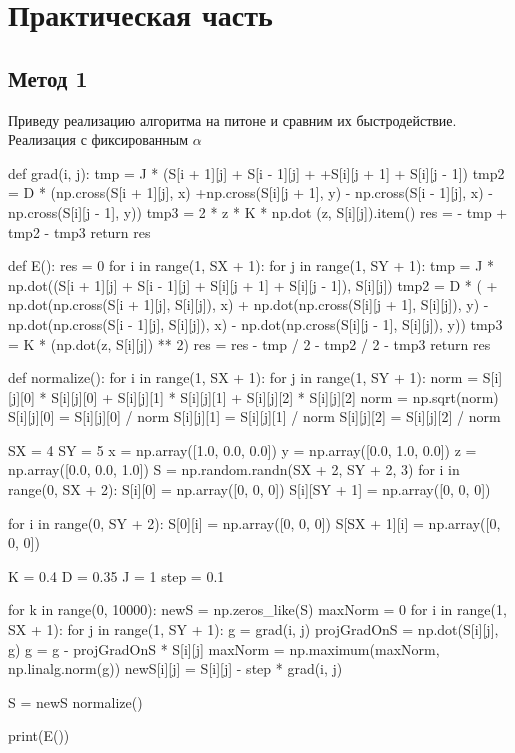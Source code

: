 \documentclass[ 12pt,x11names]{article}
\begin{document}
    \section{Практическая часть}
    \subsection{Метод 1}
    Приведу реализацию алгоритма на питоне и  сравним их быстродействие.
    Реализация с фиксированным $\alpha$\\
\begin{python}
    def grad(i, j):
        tmp = J * (S[i + 1][j] + S[i - 1][j] +
        +S[i][j + 1] + S[i][j - 1])
        tmp2 = D * (np.cross(S[i + 1][j], x)
        +np.cross(S[i][j + 1], y)
        - np.cross(S[i - 1][j], x)
        - np.cross(S[i][j - 1], y))
        tmp3 = 2 * z * K * np.dot  (z, S[i][j]).item()
        res = - tmp + tmp2 - tmp3
        return res

    def E():
        res = 0
        for i in range(1, SX + 1):
            for j in range(1, SY + 1):
                tmp = J * np.dot((S[i + 1][j] + S[i - 1][j] +
                S[i][j + 1] + S[i][j - 1]), S[i][j])
                tmp2 = D * (
                + np.dot(np.cross(S[i + 1][j], S[i][j]), x)
                + np.dot(np.cross(S[i][j + 1], S[i][j]), y)
                - np.dot(np.cross(S[i - 1][j], S[i][j]), x)
                - np.dot(np.cross(S[i][j - 1], S[i][j]), y))
                tmp3 = K * (np.dot(z, S[i][j]) ** 2)
                res = res - tmp / 2 - tmp2 / 2 - tmp3
        return res

    def normalize():
    for i in range(1, SX + 1):
        for j in range(1, SY + 1):
            norm = S[i][j][0] * S[i][j][0] +
                   S[i][j][1] * S[i][j][1] +
                   S[i][j][2] * S[i][j][2]
            norm = np.sqrt(norm)
            S[i][j][0] = S[i][j][0] / norm
            S[i][j][1] = S[i][j][1] / norm
            S[i][j][2] = S[i][j][2] / norm


    SX = 4
    SY = 5
    x = np.array([1.0, 0.0, 0.0])
    y = np.array([0.0, 1.0, 0.0])
    z = np.array([0.0, 0.0, 1.0])
    S = np.random.randn(SX + 2, SY + 2, 3)
    for i in range(0, SX + 2):
        S[i][0] = np.array([0, 0, 0])
        S[i][SY + 1] = np.array([0, 0, 0])

    for i in range(0, SY + 2):
        S[0][i] = np.array([0, 0, 0])
        S[SX + 1][i] = np.array([0, 0, 0])

    K = 0.4
    D = 0.35
    J = 1
    step = 0.1

    for k in range(0, 10000):
        newS = np.zeros_like(S)
        maxNorm = 0
        for i in range(1, SX + 1):
            for j in range(1, SY + 1):
                g = grad(i,  j)
                projGradOnS = np.dot(S[i][j], g)
                g = g - projGradOnS * S[i][j]
                maxNorm = np.maximum(maxNorm, np.linalg.norm(g))
                newS[i][j] = S[i][j] - step * grad(i, j)

        S = newS
        normalize()

print(E())
\end{python}
\end{document}
